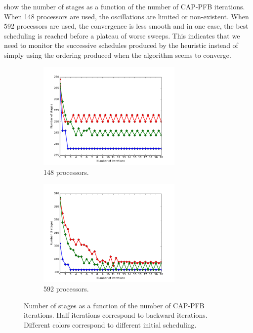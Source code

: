 \documentclass[letterpaper]{article}
\renewcommand{\(}{\left(}
\renewcommand{\)}{\right)}
\renewcommand{\[}{\left[}
\renewcommand{\]}{\right]}
\begin{document}
 show the number of stages
as a function of the number of CAP-PFB iterations. When 148 processors are used,
the oscillations are limited or non-existent. When 592 processors are used, the
convergence is less smooth and in one case, the best scheduling is reached
before a plateau of worse sweeps. This indicates that we need to monitor the
successive schedules produced by the heuristic instead of simply using the
ordering produced when the algorithm seems to converge.
\begin{figure}[H]
  \begin{subfigure}[b]{.5\textwidth}
    \centering
    \includegraphics[width=7cm]{convergence_central_148}
    \caption{148 processors.}
  \label{convergence_central_148}
  \end{subfigure}
  \begin{subfigure}[b]{.5\textwidth}
    \centering
    \includegraphics[width=7cm]{convergence_central_592}
    \caption{592 processors.}
  \label{convergence_central_592}
  \end{subfigure}
  \caption{Number of stages as a function of the number of CAP-PFB iterations.
  Half iterations correspond to backward iterations. Different colors correspond
  to different initial scheduling.}
\end{figure}
\end{document}
